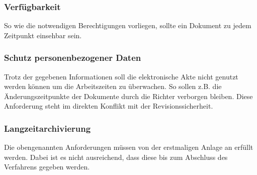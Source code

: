 \subsubsection*{Verfügbarkeit}
So wie die notwendigen Berechtigungen vorliegen, sollte ein Dokument zu jedem Zeitpunkt einsehbar sein.
\subsubsection*{Schutz personenbezogener Daten}
Trotz der gegebenen Informationen soll die elektronische Akte nicht genutzt werden können um die Arbeitszeiten zu überwachen. So sollen z.B. die Änderungszeitpunkte der Dokumente durch die Richter verborgen bleiben. Diese Anforderung steht im direkten Konflikt mit der Revisionssicherheit.
\subsubsection*{Langzeitarchivierung}
Die obengenannten Anforderungen müssen von der erstmaligen Anlage an erfüllt werden. Dabei ist es nicht ausreichend, dass diese bis zum Abschluss des Verfahrens gegeben werden.

